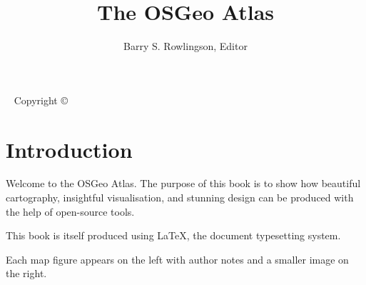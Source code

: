\documentclass[a4paper,sfsidenotes,justified]{tufte-book}
\title{The OSGeo Atlas}
\author{Barry S. Rowlingson, Editor}
\begin{document}
\maketitle

\newpage
\begin{fullwidth}
~\vfill
\setlength{\parindent}{0pt}
\setlength{\parskip}{\baselineskip}
Copyright \copyright\ \the\year\ \thanklessauthor


\end{fullwidth}



\tableofcontents

\chapter{Introduction}

Welcome to the OSGeo Atlas. The purpose of this book is to show how
beautiful cartography, insightful visualisation, and stunning design
can be produced with the help of open-source tools.

This book is itself produced using \LaTeX, the document typesetting system.

Each map figure appears on the left with author notes and a smaller
image on the right.









\backmatter

\printindex
\end{document}
